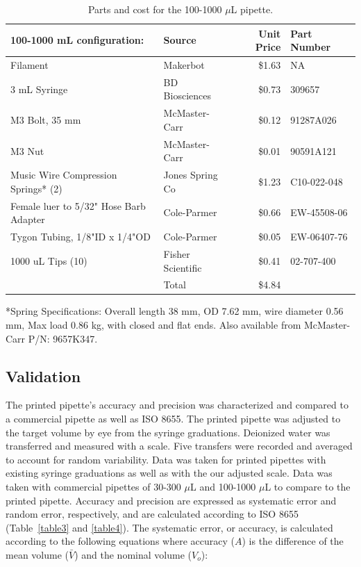 \documentclass[10pt,letterpaper]{article}
\begin{document}
\begin{table}[!ht]
\centering
\caption{Parts and cost for the 100-1000 $\mu$L pipette.}
\label{table2}
\begin{tabular}{|l|l|r|l|}
	\hline
	100-1000 mL configuration:             & Source            & Unit Price & Part Number \\ \hline
	Filament                               & Makerbot          & \$1.63     & NA          \\ \hline
	3 mL Syringe                           & BD Biosciences    & \$0.73     & 309657      \\ \hline
	M3 Bolt, 35 mm                         & McMaster-Carr     & \$0.12     & 91287A026   \\ \hline
	M3 Nut                                 & McMaster-Carr     & \$0.01     & 90591A121   \\ \hline
	Music Wire Compression Springs* (2)    & Jones Spring Co   & \$1.23     & C10-022-048 \\ \hline
	Female luer to 5/32" Hose Barb Adapter & Cole-Parmer       & \$0.66     & EW-45508-06 \\ \hline
	Tygon Tubing, 1/8"ID x 1/4"OD          & Cole-Parmer       & \$0.05     & EW-06407-76 \\ \hline
	1000 uL Tips (10)                      & Fisher Scientific & \$0.41     & 02-707-400  \\ \hline
	& Total             & \$4.84     &            \\ \hline
\end{tabular}
\begin{flushleft} *Spring Specifications: Overall length 38 mm, OD 7.62 mm, wire diameter 0.56 mm, Max load 0.86 kg, with closed and flat ends. Also available from McMaster-Carr P/N: 9657K347.
\end{flushleft}
\end{table}

\subsection*{Validation}
The printed pipette’s accuracy and precision was characterized and compared to a commercial pipette as well as ISO 8655.
The printed pipette was adjusted to the target volume by eye from the syringe graduations.
Deionized water was transferred and measured with a scale.
Five transfers were recorded and averaged to account for random variability.
Data was taken for printed pipettes with existing syringe graduations as well as with the our adjusted scale.
Data was taken with commercial pipettes of 30-300 $\mu$L and 100-1000 $\mu$L to compare to the printed pipette.
Accuracy and precision are expressed as systematic error and random error, respectively, and are calculated according to ISO 8655~\cite{ISO8655} (Table~\ref{table3} and \ref{table4}).
The systematic error, or accuracy, is calculated according to the following equations where accuracy ($A$) is the difference of the mean volume ($\bar{V}$) and the nominal volume ($V_{o}$):
\end{document}
